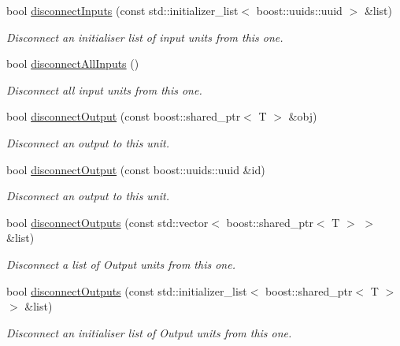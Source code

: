 \begin{DoxyCompactItemize}
bool \hyperlink{classcryomesh_1_1common_1_1Connector_aebc08e7a92cec11c1353391f9145d841}{disconnect\-Inputs} (const std\-::initializer\-\_\-list$<$ boost\-::uuids\-::uuid $>$ \&list)
\begin{DoxyCompactList}\small\item\em \-Disconnect an initialiser list of input units from this one. \end{DoxyCompactList}\item 
bool \hyperlink{classcryomesh_1_1common_1_1Connector_ae158782ad5bf70ce2913be421ace2e4d}{disconnect\-All\-Inputs} ()
\begin{DoxyCompactList}\small\item\em \-Disconnect all input units from this one. \end{DoxyCompactList}\item 
bool \hyperlink{classcryomesh_1_1common_1_1Connector_ab0c0f68c11aa53c3b407f613ffa212f1}{disconnect\-Output} (const boost\-::shared\-\_\-ptr$<$ \-T $>$ \&obj)
\begin{DoxyCompactList}\small\item\em \-Disconnect an output to this unit. \end{DoxyCompactList}\item 
bool \hyperlink{classcryomesh_1_1common_1_1Connector_a12a36aef140f4a58c688d899d086f8d1}{disconnect\-Output} (const boost\-::uuids\-::uuid \&id)
\begin{DoxyCompactList}\small\item\em \-Disconnect an output to this unit. \end{DoxyCompactList}\item 
bool \hyperlink{classcryomesh_1_1common_1_1Connector_a680ddbd6bd137f05b5a8ab9e28b73f48}{disconnect\-Outputs} (const std\-::vector$<$ boost\-::shared\-\_\-ptr$<$ \-T $>$ $>$ \&list)
\begin{DoxyCompactList}\small\item\em \-Disconnect a list of \-Output units from this one. \end{DoxyCompactList}\item 
bool \hyperlink{classcryomesh_1_1common_1_1Connector_a5b3daf294a8f5e808b7cada38cbd1cfd}{disconnect\-Outputs} (const std\-::initializer\-\_\-list$<$ boost\-::shared\-\_\-ptr$<$ \-T $>$ $>$ \&list)
\begin{DoxyCompactList}\small\item\em \-Disconnect an initialiser list of \-Output units from this one. \end{DoxyCompactList}\item 

\end{DoxyCompactItemize}
